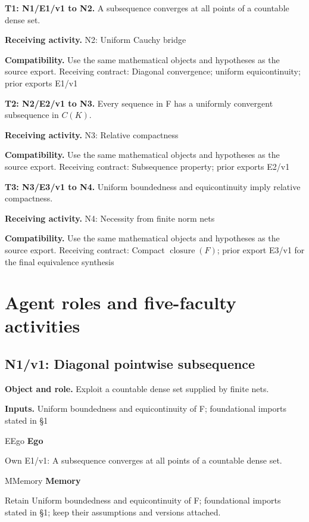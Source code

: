\documentclass[preprint,12pt,aps,pra,showkeys,amsmath,amssymb,superscriptaddress,floatfix]{revtex4-2}
\theoremstyle{definition}
\theoremstyle{remark}
\newcommand{\mmfaculty}[3]{%
 \begin{mmfacultybox}{#1}{#2}
 {\sffamily\bfseries\color{MMBlue}#2}\par\smallskip #3
 \end{mmfacultybox}}
\newcommand{\field}[2]{\par\smallskip\noindent\textbf{#1.} #2\par}
\begin{document}
\begingroup\small\linespread{1.05}\selectfont

\field{T1: N1/E1/v1 to N2}{A subsequence converges at all points of a countable dense set.}

\field{Receiving activity}{N2: Uniform Cauchy bridge}

\field{Compatibility}{Use the same mathematical objects and hypotheses as the source export.
Receiving contract: Diagonal convergence; uniform equicontinuity; prior
exports E1/v1}

\field{T2: N2/E2/v1 to N3}{Every sequence in F has a uniformly convergent subsequence in \(C(K)\).}

\field{Receiving activity}{N3: Relative compactness}

\field{Compatibility}{Use the same mathematical objects and hypotheses as the source export.
Receiving contract: Subsequence property; prior exports E2/v1}

\field{T3: N3/E3/v1 to N4}{Uniform boundedness and equicontinuity imply relative compactness.}

\field{Receiving activity}{N4: Necessity from finite norm nets}

\field{Compatibility}{Use the same mathematical objects and hypotheses as the source export.
Receiving contract: Compact \(\operatorname{closure} (F)\); prior export
E3/v1 for the final equivalence synthesis}

\endgroup

\clearpage\section{Agent roles and five-faculty activities}\begingroup\small\linespread{1.05}\selectfont{}

\subsection{N1/v1: Diagonal pointwise subsequence}

\field{Object and role}{Exploit a countable dense set supplied by finite nets.}

\field{Inputs}{Uniform boundedness and equicontinuity of F; foundational imports stated
in §1}

\mmfaculty{E}{Ego}{Own E1/v1: A subsequence converges at all points of a countable dense
set.}

\mmfaculty{M}{Memory}{Retain Uniform boundedness and equicontinuity of F; foundational imports
stated in §1; keep their assumptions and versions attached.}
\end{document}
